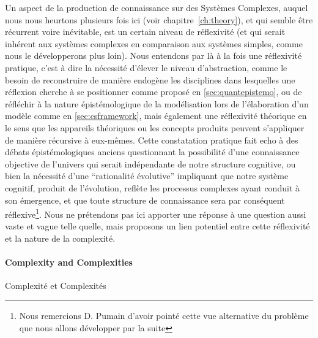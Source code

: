 Un aspect de la production de connaissance sur des Systèmes Complexes, auquel nous nous heurtons plusieurs fois ici (voir chapitre~\ref{ch:theory}), et qui semble être récurrent voire inévitable, est un certain niveau de réflexivité (et qui serait inhérent aux systèmes complexes en comparaison aux systèmes simples, comme nous le développerons plus loin). Nous entendons par là à la fois une réflexivité pratique, c'est à dire la nécessité d'élever le niveau d'abstraction, comme le besoin de reconstruire de manière endogène les disciplines dans lesquelles une réflexion cherche à se positionner comme proposé en \ref{sec:quantepistemo}, ou de réfléchir à la nature épistémologique de la modélisation lors de l'élaboration d'un modèle comme en \ref{sec:csframework}, mais également une réflexivité théorique en le sens que les appareils théoriques ou les concepts produits peuvent s'appliquer de manière récursive à eux-mêmes. Cette constatation pratique fait echo à des débats épistémologiques anciens questionnant la possibilité d'une connaissance objective de l'univers qui serait indépendante de notre structure cognitive, ou bien la nécessité d'une ``rationalité évolutive'' impliquant que notre système cognitif, produit de l'évolution, reflète les processus complexes ayant conduit à son émergence, et que toute structure de connaissance sera par conséquent réflexive\footnote{Nous remercions D. Pumain d'avoir pointé cette vue alternative du problème que nous allons développer par la suite}. Nous ne prétendons pas ici apporter une réponse à une question aussi vaste et vague telle quelle, mais proposons un lien potentiel entre cette réflexivité et la nature de la complexité.


\paragraph{Complexity and Complexities}{Complexité et Complexités}

